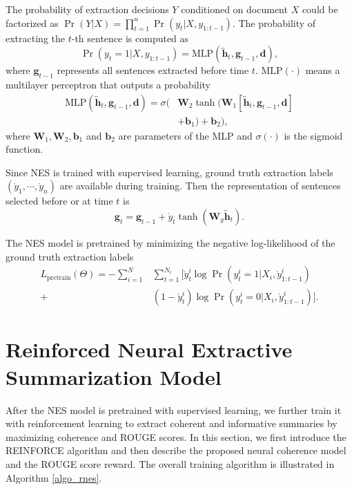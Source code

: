 \documentclass[letterpaper]{article} \usepackage{aaai18}  \usepackage{times}  \usepackage{helvet}  \usepackage{courier}  \usepackage{url}  \usepackage{graphicx}  \usepackage{amssymb}
\begin{document}
	The probability of extraction decisions $Y$ conditioned on document $X$ could be factorized as $\Pr(Y|X) = \prod_{t=1}^{n} \Pr(y_t | X, y_{1:t-1})$.
	The probability of extracting the $t$-th sentence is computed as
	\begin{equation} \label{eq:mlp}
		 \Pr(y_t=1|X, y_{1:t-1}) = \text{MLP}(\overleftrightarrow{\mathbf{h}}_t, \mathbf{g}_{t-1}, \mathbf{d} ) ,
	\end{equation}
	where $\mathbf{g}_{t-1}$ represents all sentences extracted before time $t$. $\text{MLP}(\cdot)$ means a multilayer perceptron that outputs a probability
	\begin{align*}
	\text{MLP}(\overleftrightarrow{\mathbf{h}}_t, \mathbf{g}_{t-1}, \mathbf{d} ) =  \sigma(  & \mathbf{W}_2 \tanh(\mathbf{W}_1 [\overleftrightarrow{\mathbf{h}}_t, \mathbf{g}_{t-1}, \mathbf{d}] \\
	& + \mathbf{b}_1) + \mathbf{b}_2 ),
	\end{align*}
	where $\mathbf{W}_{1},\mathbf{W}_{2}, \mathbf{b}_{1}$ and $\mathbf{b}_{2}$ are parameters of the MLP and $\sigma(\cdot)$ is the sigmoid function. 
	
	Since NES is trained with supervised learning, ground truth extraction labels $(\mathring{y}_1, \cdots, \mathring{y}_n)$ are available during training. Then the representation of sentences selected before or at time $t$ is
	\begin{equation*}
	\mathbf{g}_t =  \mathbf{g}_{t-1} + \mathring{y}_t \tanh (\mathbf{W}_{g} \overleftrightarrow{\mathbf{h}}_t) .
	\end{equation*}
	
	The NES model is pretrained by minimizing the negative log-likelihood of the ground truth extraction labels
	\begin{align*}
	L_{\text{pretrain}}(\Theta) = - \sum_{i=1}^{N} &\sum_{t=1}^{N_i} \big[ \mathring{y}_t^i \log \Pr(y_t^i=1|X_i, \mathring{y}_{1:t-1}^i)\\ 
	 + & (1 - \mathring{y}_t^i) \log \Pr(y_t^i=0|X_i, \mathring{y}_{1:t-1}^i)\big] .
	\end{align*}


	\section{Reinforced Neural Extractive Summarization Model}
	\label{sec:rl}
    After the NES model is pretrained with supervised learning, we further train it with reinforcement learning to extract coherent and informative summaries by maximizing coherence and ROUGE scores. In this section, we first introduce the REINFORCE algorithm and then describe the proposed neural coherence model and the ROUGE score reward. The overall training algorithm is illustrated in Algorithm \ref{algo_rnes}.
\end{document}
